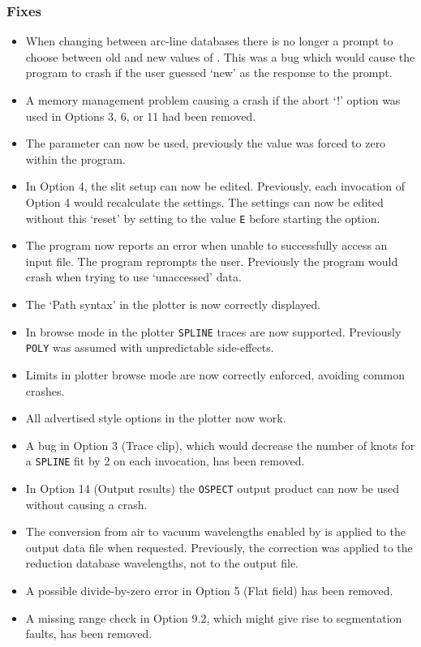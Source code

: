 \subsubsection{Fixes}

\begin{itemize}
\item When changing between arc-line databases there is no longer
   a prompt to choose between old and new values of
   .
   This was a bug which would cause the program to crash if the user
   guessed `new' as the response to the prompt.
\item A memory management problem causing a crash if the abort `!'
   option was used in Options 3, 6, or 11 had been removed.
\item The parameter 
   can now be used, previously the
   value was forced to zero within the program.
\item In Option 4, the slit setup can now be edited.  Previously,
   each invocation of Option 4 would recalculate the settings.
   The settings can now be edited without this `reset' by setting
    to the value \verb+E+
   before starting the option.
\item The program now reports an error when unable to successfully
   access an input file.  The program reprompts the user.
   Previously the program would crash when trying to use `unaccessed'
   data.
\item The `Path syntax' in the plotter is now correctly displayed.
\item In browse mode in the plotter \verb+SPLINE+ traces are now supported.
   Previously \verb+POLY+ was assumed with unpredictable side-effects.
\item Limits in plotter browse mode are now correctly enforced, avoiding
   common crashes.
\item All advertised style options in the plotter now work.
\item A bug in Option 3 (Trace clip), which would decrease the number of
   knots for a \verb+SPLINE+ fit by 2 on each invocation, has been removed.
\item In Option 14 (Output results) the \verb+OSPECT+ output product can now
   be used without causing a crash.
\item The conversion from air to vacuum wavelengths enabled by
    is applied to
   the output data file when requested.
   Previously, the correction was applied to the reduction database
   wavelengths, not to the output file.
\item A possible divide-by-zero error in Option 5 (Flat field) has been
   removed.
\item A missing range check in Option 9.2, which might give rise to
   segmentation faults, has been removed.
\end{itemize}

